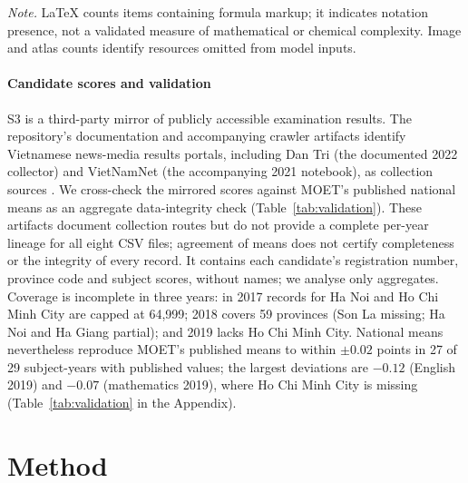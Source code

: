 \documentclass[preprint,12pt,authoryear,nonatbib]{elsarticle}
\begin{document}
\begin{table}[H]\centering\small
\caption{S1 item bank: official examinations 2019--2023}\label{tab:itembank}

\par\smallskip\raggedright\footnotesize\textit{Note.} LaTeX counts items containing formula markup; it indicates notation presence, not a validated measure of mathematical or chemical complexity. Image and atlas counts identify resources omitted from model inputs.
\end{table}

\begin{table}[H]\centering\small
\caption{S2 hard item set (presentations by format)}\label{tab:hard}

\end{table}

\paragraph{Candidate scores and validation} S3 is a third-party mirror of publicly accessible examination results. The repository's documentation and accompanying crawler artifacts identify Vietnamese news-media results portals, including Dan Tri (the documented 2022 collector) and VietNamNet (the accompanying 2021 notebook), as collection sources \citep{thptqgscores}. We cross-check the mirrored scores against MOET's published national means as an aggregate data-integrity check (Table~\ref{tab:validation}). These artifacts document collection routes but do not provide a complete per-year lineage for all eight CSV files; agreement of means does not certify completeness or the integrity of every record. It contains each candidate's registration number, province code and subject scores, without names; we analyse only aggregates. Coverage is incomplete in three years: in 2017 records for Ha Noi and Ho Chi Minh City are capped at 64,999; 2018 covers 59 provinces (Son La missing; Ha Noi and Ha Giang partial); and 2019 lacks Ho Chi Minh City. National means nevertheless reproduce MOET's published means to within $\pm0.02$ points in 27 of 29 subject-years with published values; the largest deviations are $-0.12$ (English 2019) and $-0.07$ (mathematics 2019), where Ho Chi Minh City is missing (Table~\ref{tab:validation} in the Appendix).

\section{Method}
\end{document}
